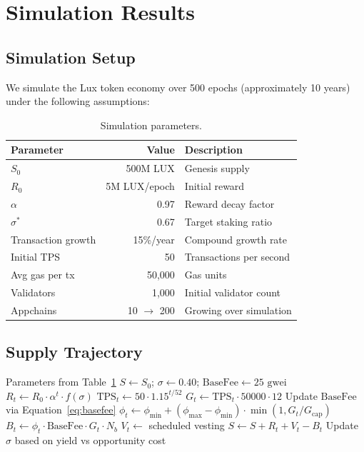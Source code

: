 \section{Simulation Results}
\label{sec:simulation}

\subsection{Simulation Setup}

We simulate the Lux token economy over 500 epochs (approximately 10 years) under the following assumptions:

\begin{table}[H]
\centering
\caption{Simulation parameters.}
\label{tab:simparams}
\begin{tabular}{lrl}
\toprule
\textbf{Parameter} & \textbf{Value} & \textbf{Description} \\
\midrule
$S_0$ & 500M LUX & Genesis supply \\
$R_0$ & 5M LUX/epoch & Initial reward \\
$\alpha$ & 0.97 & Reward decay factor \\
$\sigma^*$ & 0.67 & Target staking ratio \\
Transaction growth & 15\%/year & Compound growth rate \\
Initial TPS & 50 & Transactions per second \\
Avg gas per tx & 50,000 & Gas units \\
Validators & 1,000 & Initial validator count \\
Appchains & 10 $\to$ 200 & Growing over simulation \\
\bottomrule
\end{tabular}
\end{table}

\subsection{Supply Trajectory}

\begin{algorithm}[H]
\caption{Token Supply Simulation}
\label{alg:simulation}
\begin{algorithmic}[1]
\Require Parameters from Table~\ref{tab:simparams}
\State $S \gets S_0$; $\sigma \gets 0.40$; $\text{BaseFee} \gets 25 \text{ gwei}$
    \State $R_t \gets R_0 \cdot \alpha^t \cdot f(\sigma)$
    \State $\text{TPS}_t \gets 50 \cdot 1.15^{t/52}$
    \State $G_t \gets \text{TPS}_t \cdot 50000 \cdot 12$ 
    \State Update $\text{BaseFee}$ via Equation~\eqref{eq:basefee}
    \State $\phi_t \gets \phi_{\min} + (\phi_{\max} - \phi_{\min}) \cdot \min(1, G_t / G_{\text{cap}})$
    \State $B_t \gets \phi_t \cdot \text{BaseFee} \cdot G_t \cdot N_b$
    \State $V_t \gets$ scheduled vesting
    \State $S \gets S + R_t + V_t - B_t$
    \State Update $\sigma$ based on yield vs opportunity cost
\EndFor
\end{algorithmic}
\end{algorithm}

